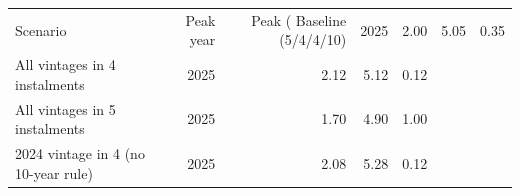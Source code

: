 \begin{tabular}{lrrrr}
\toprule
Scenario & Peak year & Peak (%
\midrule
Baseline (5/4/4/10) & 2025 & 2.00 & 5.05 & 0.35 \\
All vintages in 4 instalments & 2025 & 2.12 & 5.12 & 0.12 \\
All vintages in 5 instalments & 2025 & 1.70 & 4.90 & 1.00 \\
2024 vintage in 4 (no 10-year rule) & 2025 & 2.08 & 5.28 & 0.12 \\
\bottomrule
\end{tabular}
